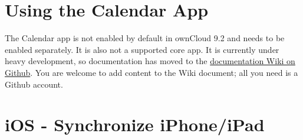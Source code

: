 \documentclass[letterpaper,10pt,english]{sphinxmanual}
\begin{document}
\section{Using the Calendar App}
\label{pim/calendar::doc}\label{pim/calendar:using-the-calendar-app}
The Calendar app is not enabled by default in ownCloud 9.2 and needs to
be enabled separately. It is also not a supported core app. It is currently
under heavy development, so documentation has moved to the \href{https://github.com/owncloud/documentation/wiki/Using-the-Calendar-App-in-ownCloud-9.0}{documentation Wiki
on Github}. You are welcome to add content to the Wiki document; all you
need is a Github account.


\section{iOS - Synchronize iPhone/iPad}
\label{pim/sync_ios::doc}\label{pim/sync_ios:ios-synchronize-iphone-ipad}
\end{document}
